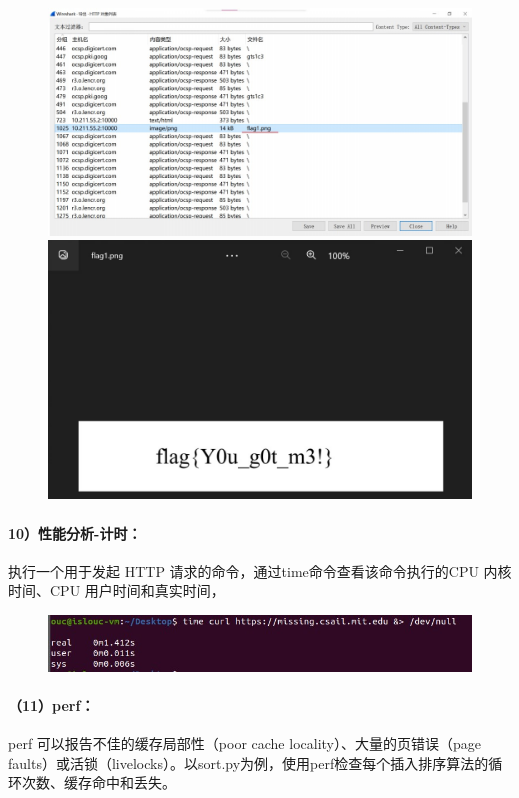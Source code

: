 \documentclass[a4paper, 12pt]{article}
\begin{document}
	\begin{figure}[H]
		\centering
		\includegraphics[width=1\textwidth]{023.jpg}
		\includegraphics[width=1\textwidth]{024.jpg}
	\end{figure}
	
	\paragraph{10）性能分析-计时：}
	执行一个用于发起 HTTP 请求的命令，通过time命令查看该命令执行的CPU 内核时间、CPU 用户时间和真实时间，
	
	\begin{figure}[H]
		\centering
		\includegraphics[width=1\textwidth]{025.jpg}
	\end{figure}
	
	\paragraph{（11）perf：}
	perf 可以报告不佳的缓存局部性（poor cache locality）、大量的页错误（page faults）或活锁（livelocks）。以sort.py为例，使用perf检查每个插入排序算法的循环次数、缓存命中和丢失。
	
\end{document}

